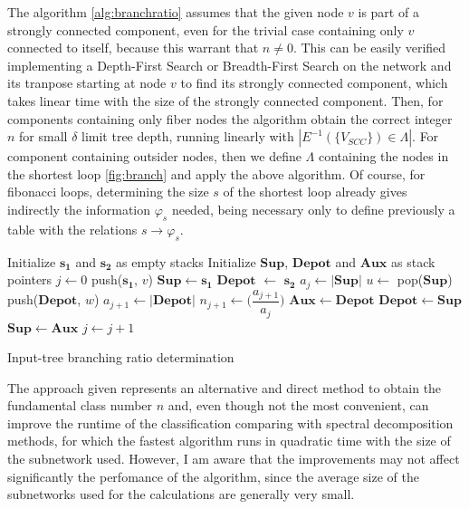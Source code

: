 \documentclass[12pt]{diazessay} %
\begin{document}
The algorithm \ref{alg:branchratio} assumes that the given node $v$ is part of a strongly connected component, even for the trivial case containing only $v$ connected to itself, because this warrant that $n \neq 0$. This can be easily verified implementing a Depth-First Search or Breadth-First Search on the network and its tranpose starting at node $v$ to find its strongly connected component, which takes linear time with the size of the strongly connected component. Then, for components containing only fiber nodes the algorithm obtain the correct integer $n$ for small $\delta$ limit tree depth, running linearly with $|E^{-1}(\{V_{SCC}\}) \in \Lambda|$. For component containing outsider nodes, then we define $\Lambda$ containing the nodes in the shortest loop \ref{fig:branch} and apply the above algorithm. Of course, for fibonacci loops, determining the size $s$ of the shortest loop already gives indirectly the information $\varphi_s$ needed, being necessary only to define previously a table with the relations $s \rightarrow \varphi_s$.

\begin{algorithm}[!h]
	\SetAlgoLined
    Initialize $\mathbf{s_1}$ and $\mathbf{s_2}$ as empty stacks\;
	Initialize $\mathbf{Sup}$, $\mathbf{Depot}$ and $\mathbf{Aux}$ as stack pointers\;
	$j \leftarrow 0$\;
	push($\mathbf{s_1}$, $v$)\;
	$\mathbf{Sup} \leftarrow \mathbf{s_1}$\;
	$\mathbf{Depot}$ $\leftarrow$ $\mathbf{s_2}$\;
	{
		$a_j \leftarrow |\mathbf{Sup}|$\;
		{
			$u \leftarrow $ pop($\mathbf{Sup}$)\;
			{
				push($\mathbf{Depot}$, $w$)\;
			}
		}
		$a_{j+1} \leftarrow |\mathbf{Depot}|$\;
		$n_{j+1} \leftarrow \bigg(\dfrac{a_{j+1}}{a_j}\bigg)$\;
		$\mathbf{Aux} \leftarrow \mathbf{Depot}$\;
		$\mathbf{Depot} \leftarrow \mathbf{Sup}$\;
		$\mathbf{Sup} \leftarrow \mathbf{Aux}$\;
		$j \leftarrow j + 1$\;
	}
	\caption{Input-tree branching ratio determination}
	\label{alg:branchratio}
\end{algorithm}

The approach given represents an alternative and direct method to obtain the fundamental class number $n$ and, even though not the most convenient, can improve the runtime of the classification comparing with spectral decomposition methods, for which the fastest algorithm runs in quadratic time with the size of the subnetwork used. However, I am aware that the improvements may not affect significantly the perfomance of the algorithm, since the average size of the subnetworks used for the calculations are generally very small.
\end{document}
